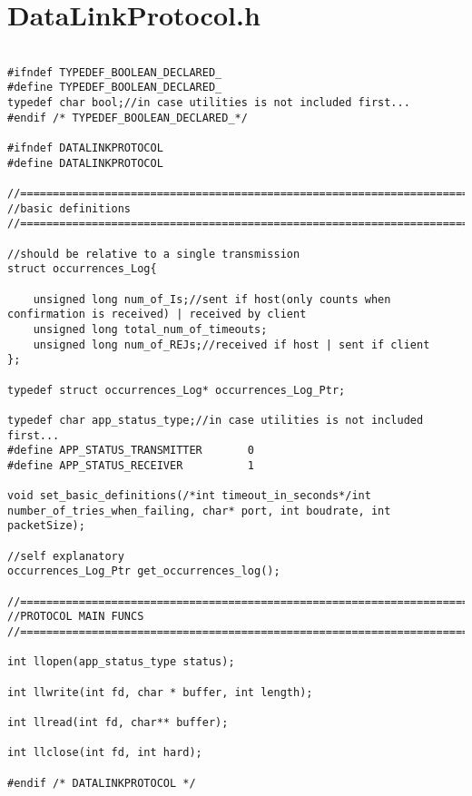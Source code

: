 \section{DataLinkProtocol.h}
\label{DATALINKPROTOCOLH}

\begin{lstlisting}
	
#ifndef TYPEDEF_BOOLEAN_DECLARED_
#define TYPEDEF_BOOLEAN_DECLARED_
typedef char bool;//in case utilities is not included first...
#endif /* TYPEDEF_BOOLEAN_DECLARED_*/

#ifndef DATALINKPROTOCOL
#define DATALINKPROTOCOL

//===============================================================================
//basic definitions
//===============================================================================

//should be relative to a single transmission
struct occurrences_Log{

	unsigned long num_of_Is;//sent if host(only counts when confirmation is received) | received by client
	unsigned long total_num_of_timeouts;
	unsigned long num_of_REJs;//received if host | sent if client
};

typedef struct occurrences_Log* occurrences_Log_Ptr;

typedef char app_status_type;//in case utilities is not included first...
#define APP_STATUS_TRANSMITTER		 0
#define APP_STATUS_RECEIVER			 1

void set_basic_definitions(/*int timeout_in_seconds*/int number_of_tries_when_failing, char* port, int boudrate, int packetSize);

//self explanatory
occurrences_Log_Ptr get_occurrences_log();

//===============================================================================
//PROTOCOL MAIN FUNCS
//===============================================================================

int llopen(app_status_type status);

int llwrite(int fd, char * buffer, int length);

int llread(int fd, char** buffer);

int llclose(int fd, int hard);

#endif /* DATALINKPROTOCOL */

\end{lstlisting}
